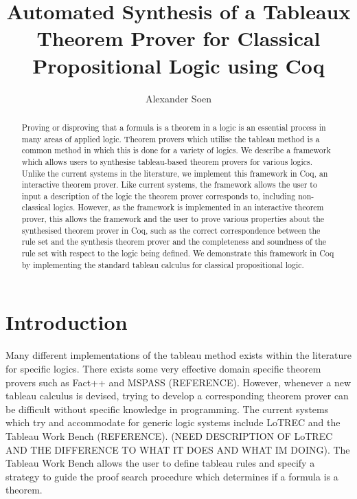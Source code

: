 \documentclass{llncs}
\begin{document}
\title{Automated Synthesis of a Tableaux Theorem Prover for Classical
Propositional Logic using Coq}

\author{Alexander Soen}

\maketitle

\begin{abstract}
Proving or disproving that a formula is a theorem in a logic is an
essential process in many areas of applied logic. Theorem provers which utilise
the tableau method is a common method in which this is done for a variety of
logics. We describe a framework which allows users to synthesise
tableau-based theorem provers for various logics. Unlike the current systems
in the literature, we implement this framework in Coq, an interactive theorem
prover. Like current systems, the framework allows the user to input a
description of the logic the theorem prover corresponds to, including
non-classical logics. However, as the framework is implemented in an
interactive theorem prover, this allows the framework and the user to prove
various properties about the synthesised theorem prover in Coq, such as the
correct correspondence between the rule set and the synthesis theorem prover
and the completeness and soundness of the rule set with respect to the logic
being defined. We demonstrate this framework in Coq by implementing the
standard tableau calculus for classical propositional logic.
\end{abstract}

\section{Introduction}

Many different implementations of the tableau method exists within the
literature for specific logics. There exists some very effective domain
specific theorem provers such as Fact++ and MSPASS (REFERENCE). However,
whenever a new tableau calculus is devised, trying to develop a corresponding
theorem prover can be difficult without specific knowledge in programming. The
current systems which try and accommodate for generic logic systems include
LoTREC and the Tableau Work Bench (REFERENCE). (NEED DESCRIPTION OF LoTREC AND
THE DIFFERENCE TO WHAT IT DOES AND WHAT IM DOING). The Tableau Work Bench
allows the user to define tableau rules and specify a strategy to guide the
proof search procedure which determines if a formula is a theorem.
\end{document}

